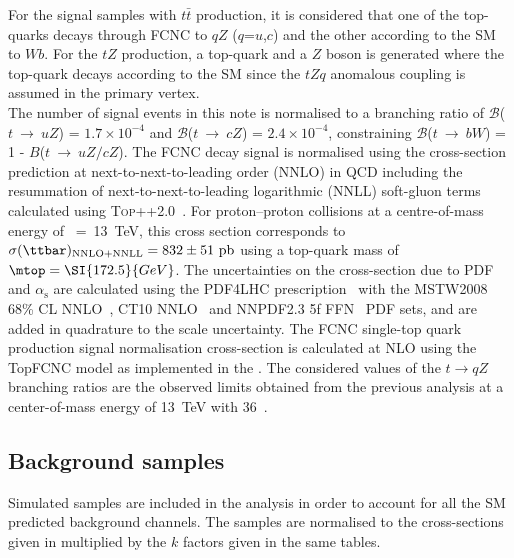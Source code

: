 For the signal samples with $t\bar{t}$ production, it is considered that one of the top-quarks decays through FCNC to $qZ$ ($q$=$u$,$c$) and the other according to the SM to $Wb$. For the $tZ$ production, a top-quark and a $Z$ boson is generated where the top-quark decays according to the SM since the $tZq$ anomalous coupling is assumed in the primary vertex. \\
The number of signal events in this note is normalised to a branching ratio of $\mathcal{B}$($t~\to~uZ$) = $1.7\times10^{-4}$ and $\mathcal{B}$($t~\to~cZ$) = $2.4\times10^{-4}$, constraining $\mathcal{B}$($t~\to~bW$) = 1 - $B$($t~\to~uZ/cZ$). The FCNC \ttbar decay signal
is normalised using the \ttbar cross-section prediction at next-to-next-to-leading order (NNLO)
in QCD including the resummation of next-to-next-to-leading logarithmic (NNLL) soft-gluon terms calculated using
\textsc{Top++2.0}~\cite{Beneke:2011mq,Cacciari:2011hy,Baernreuther:2012ws,Czakon:2012zr,Czakon:2012pz,Czakon:2013goa,Czakon:2011xx}.
For proton--proton collisions at a centre-of-mass energy of \rts~=~\SI{13}{\TeV}, this cross section corresponds to
$\sigma(\ttbar)_{\textrm{NNLO+NNLL}} = \mathrm{832\pm51~pb}$ using a top-quark mass of $\mtop = \SI{172.5}{GeV}$.
The uncertainties on the cross-section due to PDF and $\alpha_{\textrm{s}}$ are calculated using the PDF4LHC prescription~\cite{Botje:2011sn}
with the MSTW2008 68\% CL NNLO~\cite{Martin:2009iq,Martin:2009bu}, CT10 NNLO~\cite{Lai:2010vv,Gao:2013xoa} and NNPDF2.3 5f FFN~\cite{Ball:2012cx} PDF sets,
and are added in quadrature to the scale uncertainty.
The FCNC single-top quark production signal normalisation cross-section is calculated at 
NLO using the TopFCNC model as implemented in the \aMCatNLO.  
The considered values of the $t\to qZ$ branching ratios are the observed limits obtained from
the previous analysis at a center-of-mass energy of \SI{13}{\TeV} with \SI{36}{\ifb}~\cite{TOPQ-2017-06}. 

\subsection{Background samples}
\label{sec:samples:mc:bkg}

Simulated samples are included in the analysis in order to account for all the SM predicted background channels.
The samples are normalised to the cross-sections given in
\App{\ref{sec:app_mc}} multiplied by the $k$ factors given in the same
tables.

